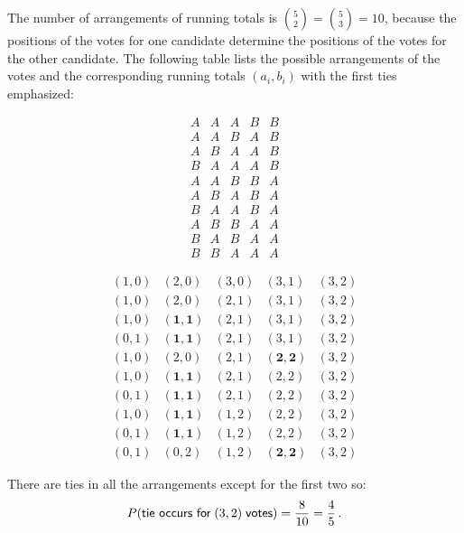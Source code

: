 The number of arrangements of running totals is ${5\choose 2}={5\choose 3}=10$, because the positions of the votes for one candidate determine the positions of the votes for the other candidate. The following table lists the possible arrangements of the votes and the corresponding running totals $(a_i,b_i)$ with the first ties emphasized:
\begin{center}
\begin{minipage}{.48\textwidth}
\[
\begin{array}{ccccc}
A & A & A & B & B\\
A & A & B & A & B\\
A & B & A & A & B\\
B & A & A & A & B\\%
A & A & B & B & A\\
A & B & A & B & A\\
B & A & A & B & A\\%
A & B & B & A & A\\
B & A & B & A & A\\%
B & B & A & A & A
\end{array}
\]
\end{minipage}
\hspace{-4em}
\begin{minipage}{.48\textwidth}
\[
\begin{array}{rrrrr}
(1,0) & (2,0) & (3,0) & (3,1) & (3,2)\\
(1,0) & (2,0) & (2,1) & (3,1) & (3,2)\\
(1,0) & \mathbf{(1,1)} & (2,1) & (3,1) & (3,2)\\
(0,1) & \mathbf{(1,1)} & (2,1) & (3,1) & (3,2)\\%
(1,0) & (2,0) & (2,1) & \mathbf{(2,2)} & (3,2)\\
(1,0) & \mathbf{(1,1)} & (2,1) & (2,2) & (3,2)\\
(0,1) & \mathbf{(1,1)} & (2,1) & (2,2) & (3,2)\\%
(1,0) & \mathbf{(1,1)} & (1,2) & (2,2) & (3,2)\\
(0,1) & \mathbf{(1,1)} & (1,2) & (2,2) & (3,2)\\%
(0,1) & (0,2) & (1,2) &  \mathbf{(2,2)} & (3,2)
\end{array}
\]
\end{minipage}
\end{center}
There are ties in all the arrangements except for the first two so:
\[
P(\textsf{tie occurs for}\;(3,2)\;\textsf{votes})=\displaystyle\frac{8}{10}=\displaystyle\frac{4}{5}\,.
\]

